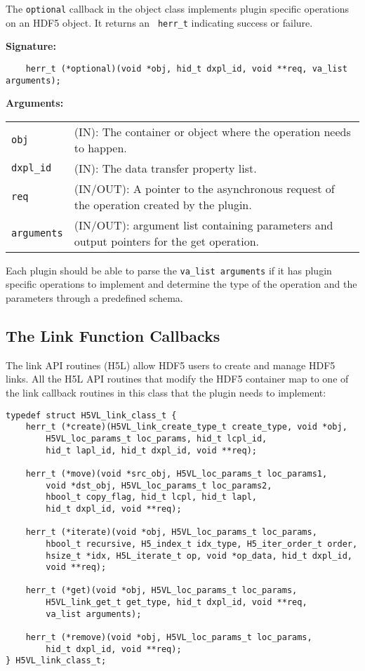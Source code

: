 The {\tt optional} callback in the object class implements plugin specific operations on an HDF5 object. It returns an {\tt
  herr\_t} indicating success or failure. 

\textbf{Signature:}
\begin{lstlisting}
    herr_t (*optional)(void *obj, hid_t dxpl_id, void **req, va_list arguments);
\end{lstlisting}

\textbf{Arguments:}\\
\begin{tabular}{l p{10cm}}
  {\tt obj} & (IN): The container or object where the operation needs to happen.\\
  {\tt dxpl\_id} & (IN): The data transfer property list.\\
  {\tt req} & (IN/OUT): A pointer to the asynchronous request of the operation created by the plugin.\\
  {\tt arguments} & (IN/OUT): argument list containing parameters and output pointers for the get operation. \\
\end{tabular}

Each plugin should be able to parse the {\tt va\_list arguments} if it has plugin specific operations to implement and determine the type of the operation and the parameters through a predefined schema. 

\subsection{The Link Function Callbacks}
The link API routines (H5L) allow HDF5 users to create and manage
HDF5 links. All the H5L API routines that modify the HDF5 container
map to one of the link callback routines in this class that the
plugin needs to implement:

\begin{lstlisting}
typedef struct H5VL_link_class_t {
    herr_t (*create)(H5VL_link_create_type_t create_type, void *obj,
        H5VL_loc_params_t loc_params, hid_t lcpl_id, 
        hid_t lapl_id, hid_t dxpl_id, void **req);

    herr_t (*move)(void *src_obj, H5VL_loc_params_t loc_params1,
        void *dst_obj, H5VL_loc_params_t loc_params2,
        hbool_t copy_flag, hid_t lcpl, hid_t lapl, 
        hid_t dxpl_id, void **req);

    herr_t (*iterate)(void *obj, H5VL_loc_params_t loc_params, 
        hbool_t recursive, H5_index_t idx_type, H5_iter_order_t order, 
        hsize_t *idx, H5L_iterate_t op, void *op_data, hid_t dxpl_id, 
        void **req);

    herr_t (*get)(void *obj, H5VL_loc_params_t loc_params, 
        H5VL_link_get_t get_type, hid_t dxpl_id, void **req, 
        va_list arguments);

    herr_t (*remove)(void *obj, H5VL_loc_params_t loc_params, 
        hid_t dxpl_id, void **req);
} H5VL_link_class_t;
\end{lstlisting}


